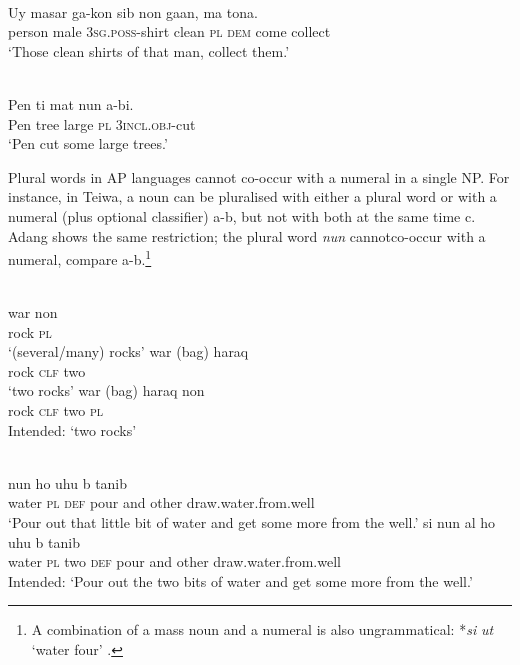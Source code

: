 \ea%
 \\
\label{ex:9:8}
\gll  Uy masar ga-kon  sib non ga{{\textglotstop}}{an,} ma {tona}{{\textglotstop}}{.}\\
   person male \textsc{3sg.poss}-shirt clean \textsc{pl} \textsc{dem} come collect\\
\glt `Those clean shirts of that man, collect them.'
\z







\ea%
 \\
\label{ex:9:9}
\gll Pen ti {mat}{{\textepsilon}} nun {\textglotstop}a-b{{\textopeno}}{{\textglotstop}}{{\textopeno}}{i.} \\
   Pen tree large \textsc{pl} \textsc{3incl.obj}-cut \\
\glt `Pen cut some large trees.'
\z






Plural words in AP languages cannot co-occur with a numeral in a single NP. For instance, in Teiwa, a noun can be pluralised with either a plural word or with a numeral (plus optional classifier) a-b, but not with both at the same time c. Adang shows the same restriction; the plural word \textit{nun} cannotco-occur with a numeral, compare a-b.\footnote{  A combination of a mass noun and a numeral is also ungrammatical: *\textit{s}\textit{{\textepsilon}}\textit{i} \textit{ut} `water four' \citep[296]{Haan2001}.}


\ea%
\label{ex:9:10}
 \\
\ea
\gll  war non\\
   rock \textsc{pl}  \\
\glt `(several/many) rocks'
\ex
\gll war (bag) {haraq}\\
 rock \textsc{clf} two  \\
\glt   `two rocks'
\ex
\gll *war (bag) haraq non \\
 rock \textsc{clf} two \textsc{pl} \\
 \glt Intended: `two rocks'
\z
\z



\ea%
\label{ex:9:11}
 \\
\ea
{} nun ho {\textglotstop}uhu{\textltailn} {\textepsilon}  b{\textepsilon}{\ng} tanib \\
   water \textsc{pl} \textsc{def} pour and other draw.water.from.well  \\
\glt `Pour out that little bit of water and get some more from the well.'
\ex
\gll *s{\textepsilon}{i} nun al{\textopeno} ho {\textglotstop}uhu{\textltailn} {\textepsilon} b{\textepsilon}{\ng} tanib \\
   water \textsc{pl} two \textsc{def} pour and other draw.water.from.well  \\
\glt  Intended: `Pour out the two bits of water and get some more from the well.'
\z
\z

